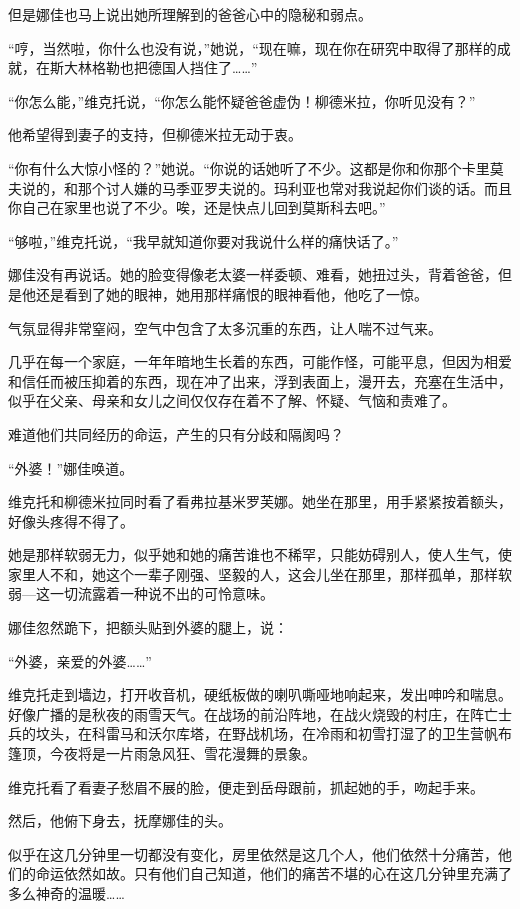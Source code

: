 但是娜佳也马上说出她所理解到的爸爸心中的隐秘和弱点。

“哼，当然啦，你什么也没有说，”她说，“现在嘛，现在你在研究中取得了那样的成就，在斯大林格勒也把德国人挡住了……”

“你怎么能，”维克托说，“你怎么能怀疑爸爸虚伪！柳德米拉，你听见没有？”

他希望得到妻子的支持，但柳德米拉无动于衷。

“你有什么大惊小怪的？”她说。“你说的话她听了不少。这都是你和你那个卡里莫夫说的，和那个讨人嫌的马季亚罗夫说的。玛利亚也常对我说起你们谈的话。而且你自己在家里也说了不少。唉，还是快点儿回到莫斯科去吧。”

“够啦，”维克托说，“我早就知道你要对我说什么样的痛快话了。”

娜佳没有再说话。她的脸变得像老太婆一样委顿、难看，她扭过头，背着爸爸，但是他还是看到了她的眼神，她用那样痛恨的眼神看他，他吃了一惊。

气氛显得非常窒闷，空气中包含了太多沉重的东西，让人喘不过气来。

几乎在每一个家庭，一年年暗地生长着的东西，可能作怪，可能平息，但因为相爱和信任而被压抑着的东西，现在冲了出来，浮到表面上，漫开去，充塞在生活中，似乎在父亲、母亲和女儿之间仅仅存在着不了解、怀疑、气恼和责难了。

难道他们共同经历的命运，产生的只有分歧和隔阂吗？

“外婆！”娜佳唤道。

维克托和柳德米拉同时看了看弗拉基米罗芙娜。她坐在那里，用手紧紧按着额头，好像头疼得不得了。

她是那样软弱无力，似乎她和她的痛苦谁也不稀罕，只能妨碍别人，使人生气，使家里人不和，她这个一辈子刚强、坚毅的人，这会儿坐在那里，那样孤单，那样软弱—这一切流露着一种说不出的可怜意味。

娜佳忽然跪下，把额头贴到外婆的腿上，说：

“外婆，亲爱的外婆……”

维克托走到墙边，打开收音机，硬纸板做的喇叭嘶哑地响起来，发出呻吟和喘息。好像广播的是秋夜的雨雪天气。在战场的前沿阵地，在战火烧毁的村庄，在阵亡士兵的坟头，在科雷马和沃尔库塔，在野战机场，在冷雨和初雪打湿了的卫生营帆布篷顶，今夜将是一片雨急风狂、雪花漫舞的景象。

维克托看了看妻子愁眉不展的脸，便走到岳母跟前，抓起她的手，吻起手来。

然后，他俯下身去，抚摩娜佳的头。

似乎在这几分钟里一切都没有变化，房里依然是这几个人，他们依然十分痛苦，他们的命运依然如故。只有他们自己知道，他们的痛苦不堪的心在这几分钟里充满了多么神奇的温暖……

